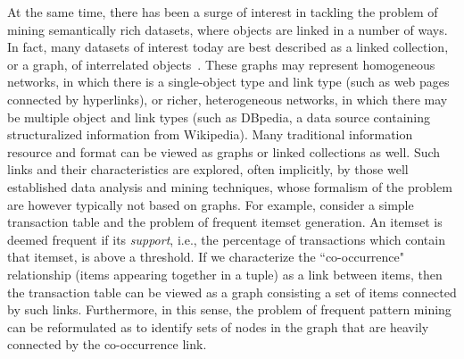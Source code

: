 At the same time, there has been a surge of interest in tackling the problem of mining semantically rich datasets, where objects are linked in a number of ways. In fact, many datasets of interest today are best described as a linked collection, or a graph, of interrelated objects~\cite{LinkMiningGetoor}. These graphs may represent homogeneous networks, in which there is a single-object type and link type (such as web pages connected by hyperlinks), or richer, heterogeneous networks, in which there may be multiple object and link types (such as DBpedia, a data source containing structuralized information from Wikipedia). Many traditional information resource and format can be viewed as graphs or linked collections as well. Such links and their characteristics are explored, often implicitly, by those well established data analysis and mining techniques, whose formalism of the problem are however typically not based on graphs. For example, consider a simple transaction table and the problem of frequent itemset generation. An itemset is deemed frequent if its \emph{support}, i.e., the percentage of transactions which contain that itemset, is above a threshold. If we characterize the ``co-occurrence" relationship (items appearing together in a tuple) as a link between items, then the transaction table can be viewed as a graph consisting a set of items connected by such links. Furthermore, in this sense, the problem of frequent pattern mining can be reformulated as to identify sets of nodes in the graph that are heavily connected by the co-occurrence link. %

